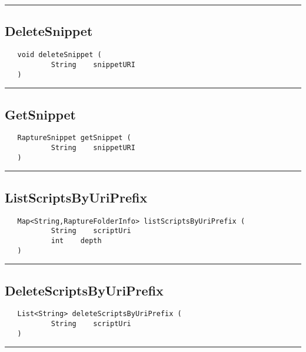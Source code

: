 \rule{15cm}{2pt}
\subsection{DeleteSnippet}
\label{Api:DeleteSnippet}
\begin{verbatim}
   void deleteSnippet (
           String    snippetURI
   )
\end{verbatim}



\rule{15cm}{2pt}
\subsection{GetSnippet}
\label{Api:GetSnippet}
\begin{verbatim}
   RaptureSnippet getSnippet (
           String    snippetURI
   )
\end{verbatim}



\rule{15cm}{2pt}
\subsection{ListScriptsByUriPrefix}
\label{Api:ListScriptsByUriPrefix}
\begin{verbatim}
   Map<String,RaptureFolderInfo> listScriptsByUriPrefix (
           String    scriptUri
           int    depth
   )
\end{verbatim}



\rule{15cm}{2pt}
\subsection{DeleteScriptsByUriPrefix}
\label{Api:DeleteScriptsByUriPrefix}
\begin{verbatim}
   List<String> deleteScriptsByUriPrefix (
           String    scriptUri
   )
\end{verbatim}



\rule{15cm}{2pt}
